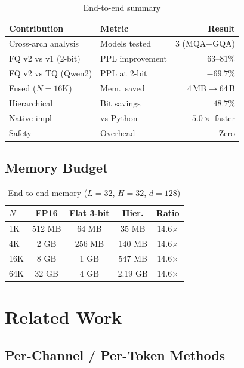 \documentclass{article}
\begin{document}
\begin{table}[t]
\centering
\small
\caption{End-to-end summary}
\label{tab:e2e}
\setlength{\tabcolsep}{4pt}
\begin{tabular}{llr}
\toprule
Contribution & Metric & Result \\
\midrule
Cross-arch analysis & Models tested & 3 (MQA+GQA) \\
FQ v2 vs v1 (2-bit) & PPL improvement & 63--81\% \\
FQ v2 vs TQ (Qwen2) & PPL at 2-bit & $\mathbf{-69.7\%}$ \\
Fused ($N{=}16$K) & Mem.\ saved & 4\,MB$\to$64\,B \\
Hierarchical & Bit savings & $\mathbf{48.7\%}$ \\
Native impl & vs Python & $\mathbf{5.0\times}$ faster \\
Safety & Overhead & Zero \\
\bottomrule
\end{tabular}
\end{table}

\subsection{Memory Budget}

\begin{table}[t]
\centering
\small
\caption{End-to-end memory ($L{=}32$, $H{=}32$, $d{=}128$)}
\label{tab:memory_e2e}
\setlength{\tabcolsep}{4pt}
\begin{tabular}{lcccc}
\toprule
$N$ & FP16 & Flat 3-bit & Hier. & Ratio \\
\midrule
1K & 512 MB & 64 MB & 35 MB & 14.6$\times$ \\
4K & 2 GB & 256 MB & 140 MB & 14.6$\times$ \\
16K & 8 GB & 1 GB & 547 MB & 14.6$\times$ \\
64K & 32 GB & 4 GB & 2.19 GB & 14.6$\times$ \\
\bottomrule
\end{tabular}
\end{table}

\section{Related Work}

\subsection{Per-Channel / Per-Token Methods}
\end{document}
